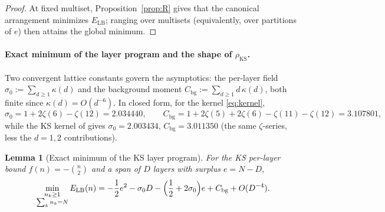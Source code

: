 \documentclass[11pt]{article}
\newtheorem{lemma}{Lemma}
\theoremstyle{remark}
\newcommand{\LB}{\mathrm{LB}}
\newcommand{\bg}{\mathrm{bg}}
\newcommand{\KS}{\mathrm{KS}}
\begin{document}
\begin{proof}
At fixed multiset, Proposition~\ref{prop:R} gives that the canonical arrangement minimizes $E_\LB$; ranging over multisets (equivalently, over partitions of $e$) then attains the global minimum.
\end{proof}

\paragraph{Exact minimum of the layer program and the shape of $\rho_\KS$.}
Two convergent lattice constants govern the asymptotics: the per-layer field $\sigma_0:=\sum_{d\ge1}\kappa(d)$ and the background moment $C_\bg:=\sum_{d\ge1} d\,\kappa(d)$, both finite since $\kappa(d)=O(d^{-6})$. In closed form, for the kernel \eqref{eq:kernel},
\[
\sigma_0 = 1+2\zeta(6)-\zeta(12) = 2.034440, \qquad C_\bg = 1+2\zeta(5)+2\zeta(6)-\zeta(11)-\zeta(12) = 3.107801,
\]
while the KS kernel of \cite{ks2025} gives $\sigma_0=2.003434$, $C_\bg=3.011350$ (the same $\zeta$-series, less the $d=1,2$ contributions).

\begin{lemma}[Exact minimum of the KS layer program]\label{lem:exactmin}
For the KS per-layer bound $f(n)=-\binom n2$ and a span of $D$ layers with surplus $e=N-D$,
\begin{equation}\label{eq:closed}
\min_{\substack{n_k\ge1\\ \sum_k n_k=N}} E_\LB(n) = -\frac12 e^2 - \sigma_0 D - \Bigl(\frac12+2\sigma_0\Bigr) e + C_\bg + O(D^{-4}).
\end{equation}
\end{lemma}
\end{document}
